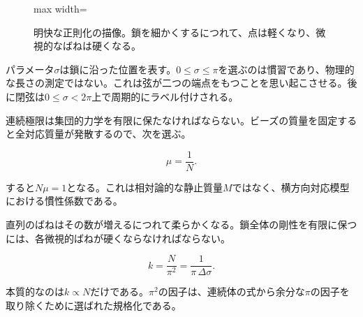 \begin{figure}[H]
  \centering
  \begin{adjustbox}{max width=\linewidth}
  \end{adjustbox}
  \caption{明快な正則化の描像。鎖を細かくするにつれて、点は軽くなり、微視的なばねは硬くなる。}
  \label{fig:l02-chain-redraw}
\end{figure}

パラメータ\(\sigma\)は鎖に沿った位置を表す。\(0\leq\sigma\leq\pi\)を選ぶのは慣習であり、物理的な長さの測定ではない。これは弦が二つの端点をもつことを思い起こさせる。後に閉弦は\(0\leq\sigma<2\pi\)上で周期的にラベル付けされる。

連続極限は集団的力学を有限に保たなければならない。ビーズの質量を固定すると全対応質量が発散するので、次を選ぶ。

\begin{equation}
  \mu=\frac{1}{N}.
  \label{eq:l02-mu-scaling}
\end{equation}

すると\(N\mu=1\)となる。これは相対論的な静止質量\(M\)ではなく、横方向対応模型における慣性係数である。

直列のばねはその数が増えるにつれて柔らかくなる。鎖全体の剛性を有限に保つには、各微視的ばねが硬くならなければならない。

\begin{equation}
  k=\frac{N}{\pi^2}
  =\frac{1}{\pi\,\Delta\sigma}.
  \label{eq:l02-k-scaling}
\end{equation}

本質的なのは\(k\propto N\)だけである。\(\pi^2\)の因子は、連続体の式から余分な\(\pi\)の因子を取り除くために選ばれた規格化である。

\begin{classroomqa}
\end{classroomqa}

